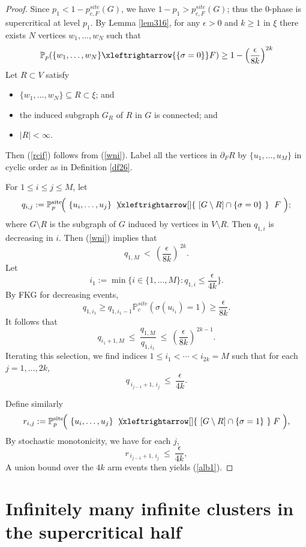 \documentclass[11pt]{amsart}
\newcommand{\xnleftrightarrow}[2][]{%
  \mathrel{\ooalign{%
    $\xleftrightarrow[#1]{#2}$\cr
\hidewidth$\mkern2mu\not\phantom{\xleftrightarrow[#1]{#2}}$\hidewidth\cr
  }}}
\theoremstyle{plain}
\numberwithin{equation}{section}
\numberwithin{figure}{section}
\newcommand\PP{{\mathbb P}}
\newcommand\si{\sigma}
\newcommand\eps{\epsilon}
\begin{document}
\begin{proof}
Since $p_1<1-p_{c,F}^{site}(G)$, we have $1-p_1>p_{c,F}^{site}(G)$; thus the $0$-phase is supercritical at level $p_1$. By Lemma \ref{lem316}, for any $\epsilon>0$ and $k\geq 1$ in $\xi$ there exists $N$ vertices $w_1,\ldots,w_N$ such that
\begin{align}
\PP_{p}(\{w_1,\ldots,w_N\}\xleftrightarrow{\{\si=0\}}F)\geq 1-\left(\frac{\epsilon}{8k}\right)^{2k}\label{wni}
\end{align}
Let $R\subset V$ satisfy
\begin{itemize}
\item $\{w_1,\ldots,w_N\}\subseteq R\subset \xi$; and
\item the induced subgraph $G_{R}$ of $R$ in $G$ is connected; and
\item $|R|<\infty$.
\end{itemize}
Then (\ref{rcif}) follows from (\ref{wni}). Label all the vertices in $\partial_F R$ by $\{u_1,\ldots,u_M\}$ in cyclic order as in Definition \ref{df26}.


For $1\le i\le j\le M$, let
\[
q_{i,j}:=\PP^{\mathrm{site}}_p\!\Big(\ \{u_i,\ldots,u_j\}\ \xnleftrightarrow{\ [G\setminus R]\cap \{\sigma =0\}\ }\ F\ \Big);
\]
where $G\setminus R$ is the subgraph of $G$ induced by vertices in $V\setminus R$.
Then $q_{1,i}$ is decreasing in $i$. Then (\ref{wni}) implies that
\[
q_{1,M}\ <\ \left(\frac{\epsilon}{8k}\right)^{\,2k}.
\]
Let
\[
i_1:=\min\Big\{i\in\{1,\ldots,M\}: q_{1,i}\le \frac{\epsilon}{4k}\Big\}.
\]
By FKG for decreasing events,
\[q_{1,i_1}\geq q_{1,i_{1}-1}\mathbb{P}_c^{site}(\si(u_{i_1})=1)\geq \frac{\epsilon}{8k}.\]
It follows that
\[
q_{i_1+1,M}\ \le\ \frac{q_{1,M}}{q_{1,i_1}}\ \le\  \left(\frac{\epsilon}{8k}\right)^{\,2k-1}.
\]
Iterating this selection, we find indices $1\le i_1<\cdots<i_{2k}=M$ such that for each $j=1,\ldots,2k$,
\[
q_{\,i_{j-1}+1,\,i_j}\ \le\  \frac{\eps}{4k}.
\]

Define similarly
\[
r_{i,j}:=\PP^{\mathrm{site}}_p\!\Big(\ \{u_i,\ldots,u_j\}\ \xnleftrightarrow{\ [G\setminus R]\cap \{\sigma=1\}\ }F\ \Big),
\]
By stochastic monotonicity, we have for each $j$,
\[
r_{\,i_{j-1}+1,\,i_j}\ \le\ \frac{\eps}{4k},%
\]
A union bound over the $4k$ arm events then yields (\ref{alb1}).
\end{proof}


\section{Infinitely many infinite clusters in the supercritical half}
\label{s5}
\end{document}
